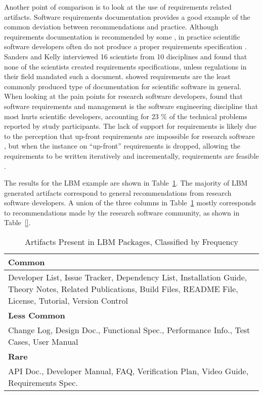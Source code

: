 \documentclass[runningheads]{llncs}
\begin{document}
Another point of comparison is to look at the use of requirements related
artifacts.  Software requirements documentation provides a good example of the
common deviation between recommendations and practice.  Although requirements
documentation is recommended by some
\cite{TobiasEtAl2018,HerouxEtAl2008,SmithAndKoothoor2016}, in practice
scientific software developers often do not produce a proper requirements
specification \cite{HeatonAndCarver2015}. Sanders and Kelly \cite{SandersAndKelly2008} interviewed
16 scientists from 10 disciplines and found that none of the scientists created
requirements specifications, unless regulations in their field mandated such a
document. \cite{Nguyen-HoanEtAl2010} showed requirements are the least commonly
produced type of documentation for scientific software in general. When looking
at the pain points for research software developers, \cite{WieseEtAl2019} found
that software requirements and management is the software engineering discipline
that most hurts scientific developers, accounting for 23 \% of the technical
problems reported by study participants.  The lack of support for requirements
is likely due to the perception that up-front requirements are impossible for
research software \cite{CarverEtAl2007,SegalAndMorris2008}, but when the
instance on ``up-front'' requirements is dropped, allowing the requirements to
be written iteratively and incrementally, requirements are feasible
\cite{Smith2016}.

The results for the LBM example are shown in Table~\ref{artifactspresent}.  The
majority of LBM generated artifacts correspond to general recommendations from
research software developers.  A union of the three columns in
Table~\ref{artifactspresent} mostly corresponds to recommendations made by the
research software community, as shown in Table~\ref{}.

\begin{table}
\begin{center}
\begin{tabular}{ p{12 cm}}
\textbf{Common}\\
\midrule
Developer List, Issue Tracker, Dependency List, Installation Guide, Theory
Notes, Related Publications, Build Files, README File, License, Tutorial,
Version Control\\
\textbf{Less Common}\\
\midrule
Change Log, Design Doc., Functional Spec., Performance Info., Test Cases, User
Manual\\
\textbf{Rare}\\
\midrule
API Doc., Developer Manual, FAQ, Verification Plan, Video Guide, Requirements
Spec.\\
\end{tabular}
\caption{Artifacts Present in LBM Packages, Classified by Frequency}
\label{artifactspresent}
\end{center}
\end{table}
\end{document}
